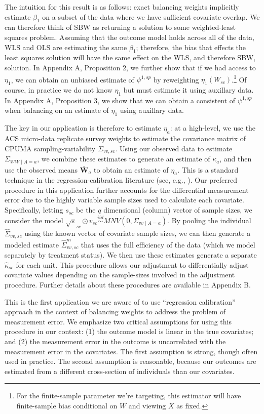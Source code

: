 \documentclass[aoas]{imsart}
\theoremstyle{plain}
\newcommand{\matr}[1]{\mathbf{#1}} %
\theoremstyle{remark}
\begin{document}
The intuition for this result is as follows: exact balancing weights implicitly estimate $\beta_1$ on a subset of the data where we have sufficient covariate overlap. We can therefore think of SBW as returning a solution to some weighted-least squares problem. Assuming that the outcome model holds across all of the data, WLS and OLS are estimating the same $\beta_1$; therefore, the bias that effects the least squares solution will have the same effect on the WLS, and therefore SBW, solution. In Appendix A, Proposition 2, we further show that if we had access to $\eta_1$, we can obtain an unbiased estimate of $\psi^{1, sp}$ by reweighting $\eta_1(W_{sc})$.\footnote{For the finite-sample parameter we're targeting, this estimator will have finite-sample bias conditional on $W$ and viewing $X$ as fixed.} Of course, in practice we do not know $\eta_1$ but must estimate it using auxillary data. In Appendix A, Proposition 3, we show that we can obtain a consistent of $\psi^{1, sp}$ when balancing on an estimate of $\eta_1$ using auxillary data. 

The key in our application is therefore to estimate $\eta_a$: at a high-level, we use the ACS micro-data replicate survey weights to estimate the covariance matrix of CPUMA sampling-variability $\Sigma_{vv, sc}$. Using our observed data to estimate $\Sigma_{WW \mid A = a}$, we combine these estimates to generate an estimate of $\kappa_a$, and then use the observed means $\bar{\matr{W}}_a$ to obtain an estimate of $\eta_a$. This is a standard technique in the regression-calibration literature (see, e.g., \cite{gleser1992importance}). Our preferred procedure in this application further accounts for the differential measurement error due to the highly variable sample sizes used to calculate each covariate. Specifically, letting $s_{sc}$ be the $q$ dimensional (column) vector of sample sizes, we consider the model $\sqrt{s}_{sc} \odot v_{sc} \stackrel{iid}\sim MNV(0, \Sigma_{vv \mid A = a})$. By pooling the individual $\hat{\Sigma}_{vv, sc}$ using the known vector of covariate sample sizes, we can then generate a modeled estimate $\hat{\Sigma}^m_{vv, sc}$ that uses the full efficiency of the data (which we model separately by treatment status). We then use these estimates generate a separate $\hat{\kappa}_{sc}$ for each unit. This procedure allows our adjustment to differentially adjust covariate values depending on the sample-sizes involved in the adjustment procedure. Further details about these procedures are available in Appendix B.

This is the first application we are aware of to use ``regression calibration'' approach in the context of balancing weights to address the problem of measurement error. We emphasize two critical assumptions for using this procedure in our context: (1) the outcome model is linear in the true covariates; and (2) the measurement error in the outcome is uncorrelated with the measurement error in the covariates. The first assumption is strong, though often used in practice. The second assumption is reasonable, because our outcomes are estimated from a different cross-section of individuals than our covariates. 
\end{document}
